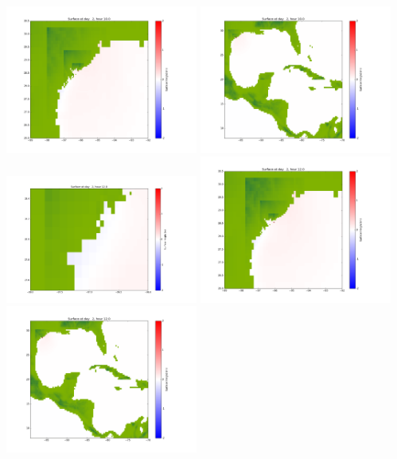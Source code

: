 \documentclass[11pt]{article}
\begin{document}
\includegraphics[width=0.475\textwidth]{frame0053fig1002.png}
\vskip 10pt 
\includegraphics[width=0.475\textwidth]{frame0053fig1003.png}
\vskip 10pt 
\includegraphics[width=0.475\textwidth]{frame0054fig1001.png}
\includegraphics[width=0.475\textwidth]{frame0054fig1002.png}
\vskip 10pt 
\includegraphics[width=0.475\textwidth]{frame0054fig1003.png}
\end{document}
